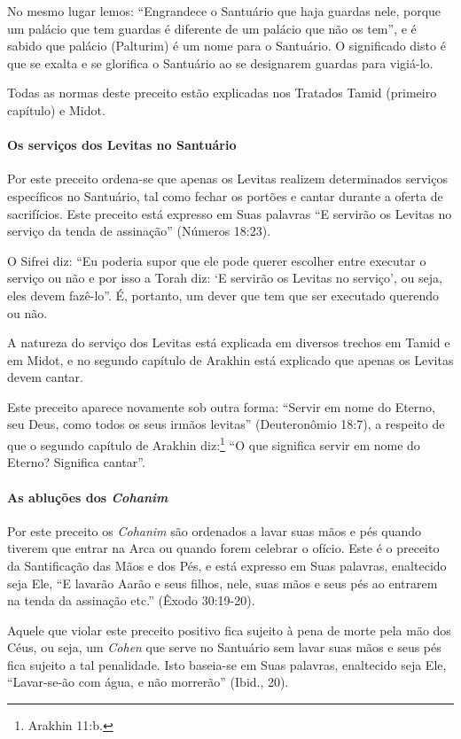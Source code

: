 No mesmo lugar lemos: ``Engrandece o Santuário que haja guardas nele,
porque um palácio que tem guardas é diferente de um palácio que não os
tem'', e é sabido que palácio (Palturim) é um nome para o Santuário. O
significado disto é que se exalta e se glorifica o Santuário ao se
designarem guardas para vigiá-lo.

Todas as normas deste preceito estão explicadas nos Tratados Tamid
(primeiro capítulo) e Midot.

\paragraph{Os serviços dos Levitas no Santuário}

Por este preceito ordena-se que apenas os Levitas realizem determinados
serviços específicos no Santuário, tal como fechar os portões e cantar
durante a oferta de sacrifícios. Este preceito está expresso em Suas
palavras ``E servirão os Levitas no serviço da tenda de assinação''
(Números 18:23).

O Sifrei diz: ``Eu poderia supor que ele pode querer escolher entre
executar o serviço ou não e por isso a Torah diz: `E servirão os Levitas
no serviço', ou seja, eles devem fazê-lo''. É, portanto, um dever que
tem que ser executado querendo ou não.

A natureza do serviço dos Levitas está explicada em diversos trechos em
Tamid e em Midot, e no segundo capítulo de Arakhin está explicado que
apenas os Levitas devem cantar.

Este preceito aparece novamente sob outra forma: ``Servir em nome do
Eterno, seu Deus, como todos os seus irmãos levitas'' (Deuteronômio
18:7), a respeito de que o segundo capítulo de Arakhin
diz:\footnote{Arakhin 11:b.} ``O que significa servir em nome do Eterno?
Significa cantar''.

\paragraph{As abluções dos \textit{Cohanim}}

Por este preceito os \textit{Cohanim} são ordenados a lavar suas mãos e pés
quando tiverem que entrar na Arca ou quando forem celebrar o ofício.
Este é o preceito da Santificação das Mãos e dos Pés, e está expresso em
Suas palavras, enaltecido seja Ele, ``E lavarão Aarão e seus filhos,
nele, suas mãos e seus pés ao entrarem na tenda da assinação etc.''
(Êxodo 30:19-20).

Aquele que violar este preceito positivo fica sujeito à pena de morte
pela mäo dos Céus, ou seja, um \textit{Cohen} que serve no Santuário sem
lavar suas mãos e seus pés fica sujeito a tal penalidade. Isto baseia-se
em Suas palavras, enaltecido seja Ele, ``Lavar-se-ão com água, e não
morrerão'' (Ibid., 20).

